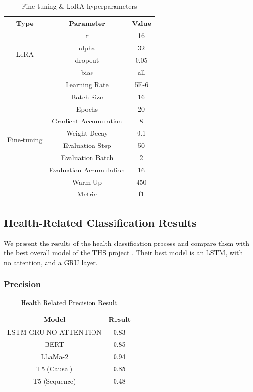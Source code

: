 \begin{table}[!htb]
	\centering
	\caption{Fine-tuning \& LoRA hyperparameters}
	{
	\begin{tabular}{||c | c | c||} 
		\hline
		\textbf{Type} & \textbf{Parameter} & \textbf{Value} \\
		\hline
		\multirow{4}{4.75em}{LoRA} & r & 16  \\ \cline{2-3}
		& alpha & 32  \\ \cline{2-3}
		& dropout & 0.05 \\ \cline{2-3}
		& bias & all \\
		\hline 
		\multirow{10}{4.75em}{Fine-tuning} & Learning Rate & 5E-6\\ \cline{2-3}
		& Batch Size & 16 \\ \cline{2-3}
		& Epochs & 20 \\ \cline{2-3}
		& Gradient Accumulation & 8 \\ \cline{2-3}
		& Weight Decay & 0.1 \\ \cline{2-3}
		& Evaluation Step & 50 \\ \cline{2-3}
		& Evaluation Batch & 2 \\ \cline{2-3}
		& Evaluation Accumulation & 16 \\ \cline{2-3}
		& Warm-Up & 450 \\ \cline{2-3}
		& Metric & f1 \\ \cline{2-3}
		\hline
	\end{tabular}
	}
	\label{table:hyperparameters}
\end{table}

\subsection{Health-Related Classification Results}
We present the results of the health classification process and compare them with the best overall model of the THS project \cite{8622504}.
Their best model is an LSTM, with no attention, and a GRU layer.

\subsubsection{Precision}
\begin{table}[htb]
	\centering
	\caption{Health Related Precision Result}
	{
	\begin{tabular}{||c | c||} 
		\hline
		\textbf{Model} & \textbf{Result} \\ 
		\hline
		LSTM GRU NO ATTENTION & 0.83  \\
		\hline		
		BERT & 0.85  \\
		\hline
		LLaMa-2 & 0.94 \\ 
		\hline
		T5 (Causal) & 0.85 \\
		\hline
		T5 (Sequence) & 0.48 \\
		\hline
	\end{tabular}
	}
	\label{table:HealthPrecision}
\end{table}

